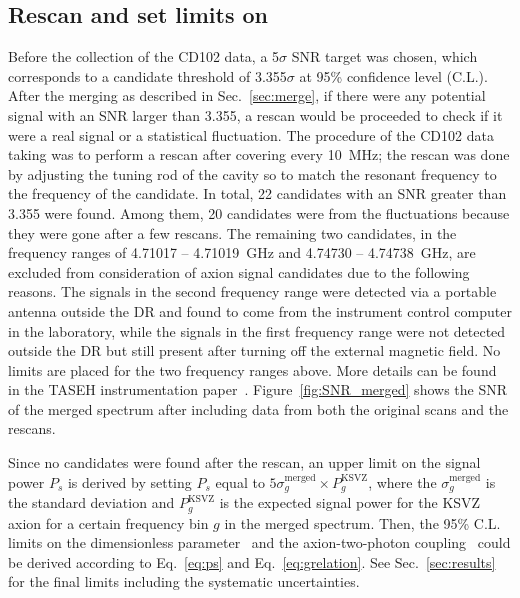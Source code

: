 \subsection{Rescan and set limits on \gagg} 
Before the collection of the CD102 data, a 5$\sigma$ SNR target was chosen, 
which corresponds to a candidate threshold of 3.355$\sigma$ at 95\% 
confidence level (C.L.).
 After the merging as described in Sec.~\ref{sec:merge}, if there were 
any potential signal with an SNR larger than 
3.355, a rescan would be proceeded to check if it were a real signal 
or a statistical fluctuation. 
The procedure of the CD102 data taking was to perform a rescan after 
covering every 10~MHz; the rescan was done by adjusting the tuning rod of the 
cavity so to match the resonant frequency to the frequency of the candidate. 
In total, 22 candidates with an SNR greater than 3.355 were found. 
Among them, 20 candidates were from the fluctuations because they were gone 
after a few rescans. The remaining two candidates, 
in the frequency ranges of 4.71017 -- 4.71019~GHz and 4.74730 -- 4.74738~GHz, 
are excluded from consideration of axion signal candidates due to the 
following reasons. 
The signals in the second frequency range 
were detected via a portable antenna outside the DR and found 
to come from the instrument control computer in the laboratory, while the 
signals in the first frequency range 
were not detected outside the DR but 
still present after turning off the external magnetic field. 
No limits are placed for the two frequency ranges above.  
More details can be found in the 
TASEH instrumentation paper~\cite{TASEHInstrumentation}. 
Figure~\ref{fig:SNR_merged} shows the SNR of the merged spectrum after 
including data from both the original scans and the rescans. 

Since no candidates were found after the rescan, an upper limit on 
the signal power $P_s$ is derived by setting $P_s$ equal to 
$5\sigma_{g}^\text{merged}\times P_{g}^\text{KSVZ}$, where 
the $\sigma_{g}^\text{merged}$ is the standard deviation 
and $P_{g}^\text{KSVZ}$ is the expected signal power for the KSVZ axion 
for a certain frequency bin $g$ in the merged spectrum. 
Then, the 95\% C.L. limits on the dimensionless parameter 
\ggamma\ and the axion-two-photon coupling \gagg\ could be derived 
according to Eq.~\eqref{eq:ps} and Eq.~\eqref{eq:grelation}. 
See Sec.~\ref{sec:results} for the final limits including the systematic 
uncertainties.

